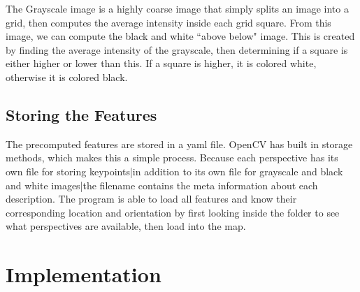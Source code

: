 \documentclass[a4paper,11pt]{article}
\begin{document}
The Grayscale image is a highly coarse image that simply splits an image into a grid, then computes the average intensity inside each grid square. From this image, we can compute the black and white ``above below" image. This is created by finding the average intensity of the grayscale, then determining if a square is either higher or lower than this. If a square is higher, it is colored white, otherwise it is colored black.

  \subsection{Storing the Features}
The precomputed features are stored in a yaml file. OpenCV has built in storage methods, which makes this a simple process. Because each perspective has its own file for storing keypoints|in addition to its own file for grayscale and black and white images|the filename contains the meta information about each description. The program is able to load all features and know their corresponding location and orientation by first looking inside the folder to see what perspectives are available, then load into the map.


















  \section{Implementation}
\end{document}
